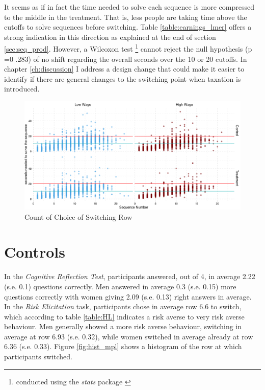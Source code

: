 It seems as if in fact the time needed to solve each sequence is more compressed to the middle in the treatment. That is, less people are taking time above the cutoffs to solve sequences before switching. Table \ref{table:earnings_lmer} offers a strong indication in this direction as explained at the end of section \ref{sec:seq_prod}. However, a Wilcoxon test \footnote{conducted using the \textit{stats} package \cite{rcoreteam2014}} cannot reject the null hypothesis (p =0 .283) of no shift regarding the overall seconds over the 10 or 20 cutoffs. In chapter \ref{ch:discussion} I address a design change that could make it easier to identify if there are general changes to the switching point when taxation is introduced.\\

\begin{figure}
    \centering
    \includegraphics[width=\textwidth]{graphs/time_task_grid.png}
    \caption{Count of Choice of Switching Row}
    \label{fig:time_per_task}
\end{figure}

\section{Controls}

In the \textit{Cognitive Reflection Test}, participants answered, out of 4, in average 2.22 (s.e. 0.1) questions correctly. Men answered in average 0.3 (s.e. 0.15) more questions correctly with women giving 2.09 (s.e. 0.13) right answers in average.\\

In the \textit{Risk Elicitation} task, participants chose in average row 6.6 to switch, which according to table \ref{table:HL} indicates a risk averse to very risk averse behaviour. Men generally showed a more risk averse behaviour, switching in average at row 6.93 (s.e. 0.32), while women switched in average already at row 6.36 (s.e. 0.33). Figure \ref{fig:hist_mpl} shows a histogram of the row at which participants switched.\\

